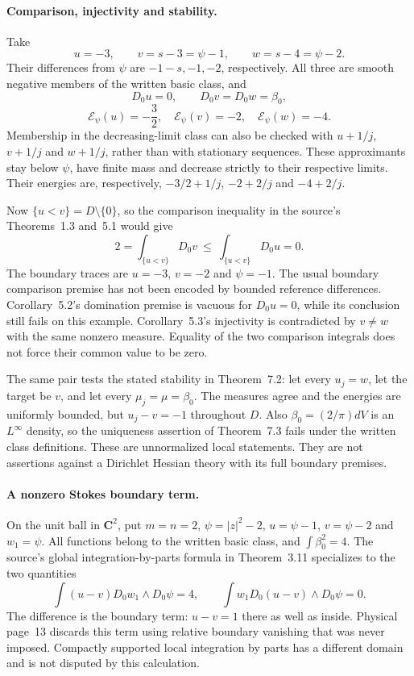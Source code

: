 \paragraph{Comparison, injectivity and stability.}
Take
\[
 u=-3,\qquad v=s-3=\psi-1,\qquad w=s-4=\psi-2.
\]
Their differences from $\psi$ are $-1-s,-1,-2$, respectively.
All three are smooth negative members of the written basic class, and
\[
 D_0u=0,\qquad D_0v=D_0w=\beta_0,
\]
\[
 \mathcal E_\psi(u)=-\frac32,\quad
 \mathcal E_\psi(v)=-2,\quad
 \mathcal E_\psi(w)=-4.
\]
Membership in the decreasing-limit class can also be checked with
$u+1/j$, $v+1/j$ and $w+1/j$, rather than with stationary sequences.
These approximants stay below $\psi$, have finite mass and decrease
strictly to their respective limits. Their energies are, respectively,
$-3/2+1/j$, $-2+2/j$ and $-4+2/j$.

Now $\{u<v\}=D\setminus\{0\}$, so the comparison inequality in the
source's Theorems~1.3 and~5.1 would give
\[
 2=\int_{\{u<v\}}D_0v
 \ \leq\ \int_{\{u<v\}}D_0u=0.
\]
The boundary traces are $u=-3$, $v=-2$ and $\psi=-1$.
The usual boundary comparison premise has not been encoded by bounded
reference differences. Corollary~5.2's domination premise is vacuous
for $D_0u=0$, while its conclusion still fails on this example.
Corollary~5.3's injectivity is contradicted by $v\ne w$ with the same
nonzero measure. Equality of the two comparison integrals does not
force their common value to be zero.

The same pair tests the stated stability in Theorem~7.2:
let every $u_j=w$, let the target be $v$, and let
every $\mu_j=\mu=\beta_0$. The measures agree and the energies are
uniformly bounded, but $u_j-v=-1$ throughout $D$.
Also $\beta_0=(2/\pi)dV$ is an $L^\infty$ density, so the uniqueness
assertion of Theorem~7.3 fails under the written class definitions.
These are unnormalized local statements. They are not assertions
against a Dirichlet Hessian theory with its full boundary premises.

\paragraph{A nonzero Stokes boundary term.}
On the unit ball in $\mathbf C^2$, put $m=n=2$,
$\psi=|z|^2-2$, $u=\psi-1$, $v=\psi-2$ and $w_1=\psi$.
All functions belong to the written basic class, and
$\int\beta_0^2=4$. The source's global integration-by-parts
formula in Theorem~3.11 specializes to the two quantities
\[
 \int (u-v)D_0w_1\wedge D_0\psi=4,\qquad
 \int w_1D_0(u-v)\wedge D_0\psi=0.
\]
The difference is the boundary term: $u-v=1$ there as well as inside.
Physical page~13 discards this term using relative boundary vanishing
that was never imposed. Compactly supported local integration by parts
has a different domain and is not disputed by this calculation.

